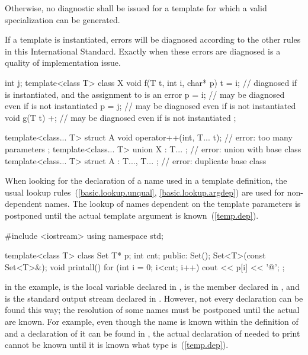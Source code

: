 Otherwise, no diagnostic shall be issued for a template
for which a valid specialization can be generated.
\begin{note}
If a template is instantiated, errors will be diagnosed according
to the other rules in this International Standard.
Exactly when these errors are diagnosed is a quality of implementation issue.
\end{note}
\begin{example}

\begin{codeblock}
int j;
template<class T> class X {
  void f(T t, int i, char* p) {
    t = i;          // diagnosed if  is instantiated, and the assignment to  is an error
    p = i;          // may be diagnosed even if  is not instantiated
    p = j;          // may be diagnosed even if  is not instantiated
  }
  void g(T t) {
    +;              // may be diagnosed even if  is not instantiated
  }
};

template<class... T> struct A {
  void operator++(int, T... t);                     // error: too many parameters
};
template<class... T> union X : T... { };            // error: union with base class
template<class... T> struct A : T...,  T... { };    // error: duplicate base class
\end{codeblock}
\end{example}

\pnum
When looking for the declaration of a name used in a template definition,
the usual lookup rules~(\ref{basic.lookup.unqual}, \ref{basic.lookup.argdep})
are used for non-dependent names.
The lookup of names dependent on the template parameters
is postponed until the actual template argument is known~(\ref{temp.dep}).
\begin{example}

\begin{codeblock}
#include <iostream>
using namespace std;

template<class T> class Set {
  T* p;
  int cnt;
public:
  Set();
  Set<T>(const Set<T>&);
  void printall() {
    for (int i = 0; i<cnt; i++)
      cout << p[i] << '@\textbackslash@n';
  }
};
\end{codeblock}

in the example,
is the local variable
declared in
,
is the member
declared in
,
and
is the standard output stream declared in
.
However, not every declaration can be found this way; the resolution of
some names must be postponed
until the actual
are known.
For example, even though the name
is known within the definition of
and a declaration of it can be found in
,
the actual declaration of
needed to print
cannot be known until it is known what type
is~(\ref{temp.dep}).
\end{example}

